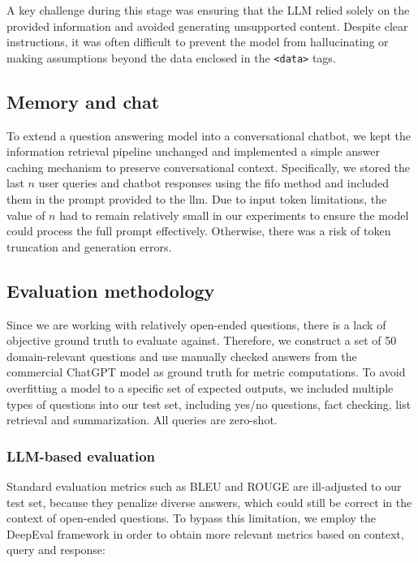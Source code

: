 \documentclass[fleqn,moreauthors,10pt]{ds_report}
\begin{document}
A key challenge during this stage was ensuring that the LLM relied solely on the provided information and avoided generating unsupported content. Despite clear instructions, it was often difficult to prevent the model from hallucinating or making assumptions beyond the data enclosed in the \verb|<data>| tags.

\subsection*{Memory and chat}

To extend a question answering model into a conversational chatbot, we kept the information retrieval pipeline unchanged and implemented a simple answer caching mechanism to preserve conversational context. Specifically, we stored the last $n$ user queries and chatbot responses using the \ac{fifo} method and included them in the prompt provided to the \ac{llm}. Due to input token limitations, the value of $n$ had to remain relatively small in our experiments to ensure the model could process the full prompt effectively. Otherwise, there was a risk of token truncation and generation errors.

\subsection*{Evaluation methodology}

Since we are working with relatively open-ended questions, there is a lack of objective ground truth to evaluate against. Therefore, we construct a set of 50 domain-relevant questions and use manually checked answers from the commercial ChatGPT model as ground truth for metric computations. To avoid overfitting a model to a specific set of expected outputs, we included multiple types of questions into our test set, including yes/no questions, fact checking, list retrieval and summarization. All queries are zero-shot.


\subsubsection*{LLM-based evaluation}

Standard evaluation metrics such as BLEU and ROUGE are ill-adjusted to our test set, because they penalize diverse answers, which could still be correct in the context of open-ended questions. To bypass this limitation, we employ the DeepEval framework \cite{deepeval} in order to obtain more relevant metrics based on context, query and response:
\end{document}
